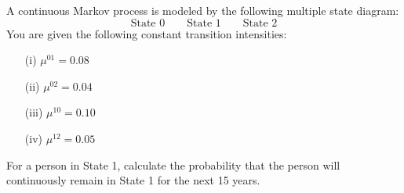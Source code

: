 A continuous Markov process is modeled by the following multiple state diagram:
\[   \text{State 0}\qquad\text{State 1}\qquad\text{State 2} \]
You are given the following constant transition intensities:
\begin{itemize}
\item[(i)] $\mu^{01} = 0.08$
\item[(ii)]  $\mu^{02} = 0.04$
\item[(iii)]  $\mu^{10} = 0.10$
\item[(iv)]  $\mu^{12} = 0.05$
\end{itemize}
For a person in State 1, calculate the probability that the person will continuously remain in State 1 for the next 15 years.
